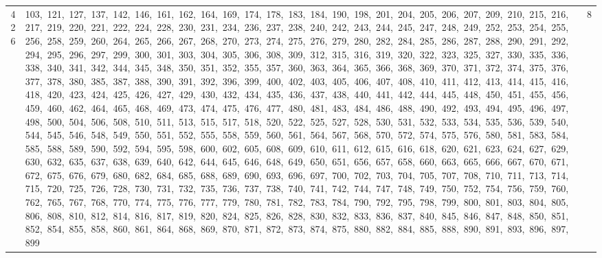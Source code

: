 \begin{longtable}{c|p{}|r}
426 & 103,\ 121,\ 127,\ 137,\ 142,\ 146,\ 161,\ 162,\ 164,\ 169,\ 174,\ 178,\ 183,\ 184,\ 190,\ 198,\ 201,\ 204,\ 205,\ 206,\ 207,\ 209,\ 210,\ 215,\ 216,\ 217,\ 219,\ 220,\ 221,\ 222,\ 224,\ 228,\ 230,\ 231,\ 234,\ 236,\ 237,\ 238,\ 240,\ 242,\ 243,\ 244,\ 245,\ 247,\ 248,\ 249,\ 252,\ 253,\ 254,\ 255,\ 256,\ 258,\ 259,\ 260,\ 264,\ 265,\ 266,\ 267,\ 268,\ 270,\ 273,\ 274,\ 275,\ 276,\ 279,\ 280,\ 282,\ 284,\ 285,\ 286,\ 287,\ 288,\ 290,\ 291,\ 292,\ 294,\ 295,\ 296,\ 297,\ 299,\ 300,\ 301,\ 303,\ 304,\ 305,\ 306,\ 308,\ 309,\ 312,\ 315,\ 316,\ 319,\ 320,\ 322,\ 323,\ 325,\ 327,\ 330,\ 335,\ 336,\ 338,\ 340,\ 341,\ 342,\ 344,\ 345,\ 348,\ 350,\ 351,\ 352,\ 355,\ 357,\ 360,\ 363,\ 364,\ 365,\ 366,\ 368,\ 369,\ 370,\ 371,\ 372,\ 374,\ 375,\ 376,\ 377,\ 378,\ 380,\ 385,\ 387,\ 388,\ 390,\ 391,\ 392,\ 396,\ 399,\ 400,\ 402,\ 403,\ 405,\ 406,\ 407,\ 408,\ 410,\ 411,\ 412,\ 413,\ 414,\ 415,\ 416,\ 418,\ 420,\ 423,\ 424,\ 425,\ 426,\ 427,\ 429,\ 430,\ 432,\ 434,\ 435,\ 436,\ 437,\ 438,\ 440,\ 441,\ 442,\ 444,\ 445,\ 448,\ 450,\ 451,\ 455,\ 456,\ 459,\ 460,\ 462,\ 464,\ 465,\ 468,\ 469,\ 473,\ 474,\ 475,\ 476,\ 477,\ 480,\ 481,\ 483,\ 484,\ 486,\ 488,\ 490,\ 492,\ 493,\ 494,\ 495,\ 496,\ 497,\ 498,\ 500,\ 504,\ 506,\ 508,\ 510,\ 511,\ 513,\ 515,\ 517,\ 518,\ 520,\ 522,\ 525,\ 527,\ 528,\ 530,\ 531,\ 532,\ 533,\ 534,\ 535,\ 536,\ 539,\ 540,\ 544,\ 545,\ 546,\ 548,\ 549,\ 550,\ 551,\ 552,\ 555,\ 558,\ 559,\ 560,\ 561,\ 564,\ 567,\ 568,\ 570,\ 572,\ 574,\ 575,\ 576,\ 580,\ 581,\ 583,\ 584,\ 585,\ 588,\ 589,\ 590,\ 592,\ 594,\ 595,\ 598,\ 600,\ 602,\ 605,\ 608,\ 609,\ 610,\ 611,\ 612,\ 615,\ 616,\ 618,\ 620,\ 621,\ 623,\ 624,\ 627,\ 629,\ 630,\ 632,\ 635,\ 637,\ 638,\ 639,\ 640,\ 642,\ 644,\ 645,\ 646,\ 648,\ 649,\ 650,\ 651,\ 656,\ 657,\ 658,\ 660,\ 663,\ 665,\ 666,\ 667,\ 670,\ 671,\ 672,\ 675,\ 676,\ 679,\ 680,\ 682,\ 684,\ 685,\ 688,\ 689,\ 690,\ 693,\ 696,\ 697,\ 700,\ 702,\ 703,\ 704,\ 705,\ 707,\ 708,\ 710,\ 711,\ 713,\ 714,\ 715,\ 720,\ 725,\ 726,\ 728,\ 730,\ 731,\ 732,\ 735,\ 736,\ 737,\ 738,\ 740,\ 741,\ 742,\ 744,\ 747,\ 748,\ 749,\ 750,\ 752,\ 754,\ 756,\ 759,\ 760,\ 762,\ 765,\ 767,\ 768,\ 770,\ 774,\ 775,\ 776,\ 777,\ 779,\ 780,\ 781,\ 782,\ 783,\ 784,\ 790,\ 792,\ 795,\ 798,\ 799,\ 800,\ 801,\ 803,\ 804,\ 805,\ 806,\ 808,\ 810,\ 812,\ 814,\ 816,\ 817,\ 819,\ 820,\ 824,\ 825,\ 826,\ 828,\ 830,\ 832,\ 833,\ 836,\ 837,\ 840,\ 845,\ 846,\ 847,\ 848,\ 850,\ 851,\ 852,\ 854,\ 855,\ 858,\ 860,\ 861,\ 864,\ 868,\ 869,\ 870,\ 871,\ 872,\ 873,\ 874,\ 875,\ 880,\ 882,\ 884,\ 885,\ 888,\ 890,\ 891,\ 893,\ 896,\ 897,\ 899 & 8 \\

\end{longtable}
